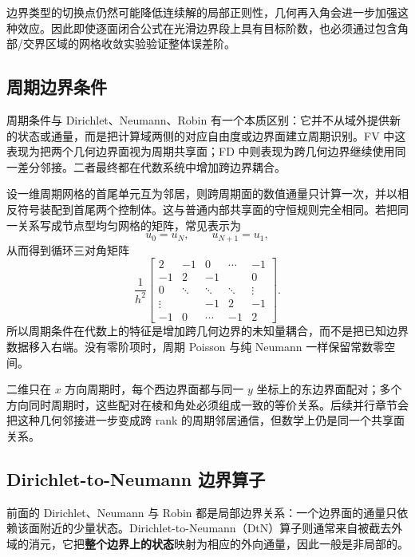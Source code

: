 边界类型的切换点仍然可能降低连续解的局部正则性，几何再入角会进一步加强这种效应。因此即使逐面闭合公式在光滑边界段上具有目标阶数，也必须通过包含角部/交界区域的网格收敛实验验证整体误差阶。

\subsection{周期边界条件}

周期条件与 Dirichlet、Neumann、Robin 有一个本质区别：它并不从域外提供新的状态或通量，而是把计算域两侧的对应自由度或边界面建立周期识别。FV 中这表现为把两个几何边界面视为周期共享面；FD 中则表现为跨几何边界继续使用同一差分邻接。二者最终都在代数系统中增加跨边界耦合。

设一维周期网格的首尾单元互为邻居，则跨周期面的数值通量只计算一次，并以相反符号装配到首尾两个控制体。这与普通内部共享面的守恒规则完全相同。若把同一关系写成节点型均匀网格的矩阵，常见表示为
\begin{equation}
u_0=u_N,
\qquad
u_{N+1}=u_1,
\end{equation}
从而得到循环三对角矩阵
\begin{equation}
\frac1{h^2}
\begin{bmatrix}
2&-1&0&\cdots&-1\\
-1&2&-1&&0\\
0&\ddots&\ddots&\ddots&\vdots\\
\vdots&&-1&2&-1\\
-1&0&\cdots&-1&2
\end{bmatrix}.
\label{eq:discretization-periodic-matrix}
\end{equation}
所以周期条件在代数上的特征是增加跨几何边界的未知量耦合，而不是把已知边界数据移入右端。没有零阶项时，周期 Poisson 与纯 Neumann 一样保留常数零空间。

二维只在 $x$ 方向周期时，每个西边界面都与同一 $y$ 坐标上的东边界面配对；多个方向同时周期时，这些配对在棱和角处必须组成一致的等价关系。后续并行章节会把这种几何邻接进一步变成跨 rank 的周期邻居通信，但数学上仍是同一个共享面关系。

\subsection{Dirichlet-to-Neumann 边界算子}

前面的 Dirichlet、Neumann 与 Robin 都是局部边界关系：一个边界面的通量只依赖该面附近的少量状态。Dirichlet-to-Neumann（DtN）算子则通常来自被截去外域的消元，它把\textbf{整个边界上的状态}映射为相应的外向通量，因此一般是非局部的。

